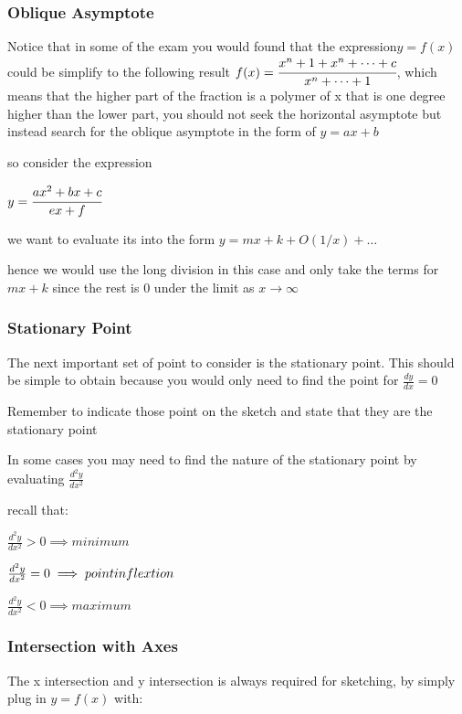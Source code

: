 \documentclass[]{article}
\begin{document}
\subsubsection{Oblique Asymptote}\label{header-n167}

Notice that in some of the exam you would found that the
expression\(y = f(x)\) could be simplify to the following result
\(f(x) = \cfrac{x^n+1 + x^n + \dots + c}{x^n + \dots + 1}\), which means
that the higher part of the fraction is a polymer of x that is one
degree higher than the lower part, you should not seek the horizontal
asymptote but instead search for the oblique asymptote in the form of
\(y = ax+b\)

so consider the expression

\(y = \cfrac{ax^2 + bx + c}{ex+f}\)

we want to evaluate its into the form \(y = mx + k + O(1/x)  +\dots\)

hence we would use the long division in this case and only take the
terms for \(mx + k\) since the rest is 0 under the limit as
\(x \rightarrow \infty\)

\subsubsection{Stationary Point}\label{header-n173}

The next important set of point to consider is the stationary point.
This should be simple to obtain because you would only need to find the
point for \(\frac{dy}{dx} = 0\)

Remember to indicate those point on the sketch and state that they are
the stationary point

In some cases you may need to find the nature of the stationary point by
evaluating \(\frac{d^2y}{dx^2}\)

recall that:

\(\frac{d^2y}{dx^2} > 0 \implies minimum\)

\(\frac{d^2y}{dx^2} = 0 \implies point \space inflextion\)

\(\frac{d^2y}{dx^2} < 0 \implies maximum\)

\subsubsection{Intersection with Axes}\label{header-n181}

The x intersection and y intersection is always required for sketching,
by simply plug in \(y=f(x)\) with:
\end{document}
